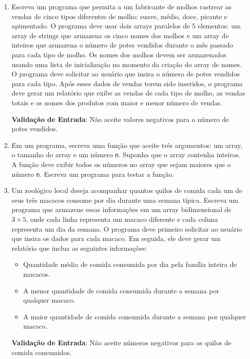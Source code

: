 \documentclass[12pt]{article}
\begin{document}
\begin{enumerate}
      \item Escreva um programa que permita a um fabricante de molhos rastrear as vendas de cinco tipos diferentes de molho: suave, médio, doce, picante e apimentado. O programa deve usar dois arrays paralelos de 5 elementos: um array de strings que armazena os cinco nomes dos molhos e um array de inteiros que armazena o número de potes vendidos durante o mês passado para cada tipo de molho. Os nomes dos molhos devem ser armazenados usando uma lista de inicialização no momento da criação do array de nomes. O programa deve solicitar ao usuário que insira o número de potes vendidos para cada tipo. Após esses dados de vendas terem sido inseridos, o programa deve gerar um relatório que exibe as vendas de cada tipo de molho, as vendas totais e os nomes dos produtos com maior e menor número de vendas.

            \textbf{Validação de Entrada}: Não aceite valores negativos para o número de potes vendidos.

      \item Em um programa, escreva uma função que aceite três argumentos: um array, o tamanho do array e um número \texttt{n}. Suponha que o array contenha inteiros. A função deve exibir todos os números no array que sejam maiores que o número \texttt{n}. Escreva um programa para testar a função.

      \item Um zoológico local deseja acompanhar quantos quilos de comida cada um de seus três macacos consome por dia durante uma semana típica. Escreva um programa que armazene essas informações em um array bidimensional de $3\times5$, onde cada linha representa um macaco diferente e cada coluna representa um dia da semana. O programa deve primeiro solicitar ao usuário que insira os dados para cada macaco. Em seguida, ele deve gerar um relatório que inclua as seguintes informações:
            \begin{itemize}
                  \item Quantidade média de comida consumida por dia pela família inteira de macacos.
                  \item A menor quantidade de comida consumida durante a semana por qualquer macaco.
                  \item A maior quantidade de comida consumida durante a semana por qualquer macaco.
            \end{itemize}

            \textbf{Validação de Entrada}: Não aceite números negativos para os quilos de comida consumidos.


\end{enumerate}
\end{document}
